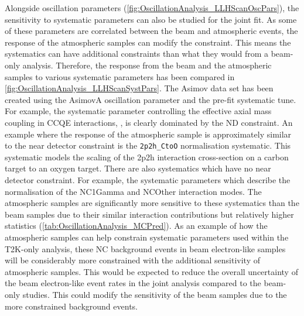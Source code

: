 \clearpage

Alongside oscillation parameters (\autoref{fig:OscillationAnalysis_LLHScanOscPars}), the sensitivity to systematic parameters can also be studied for the joint fit. As some of these parameters are correlated between the beam and atmospheric events, the response of the atmospheric samples can modify the constraint. This means the systematics can have additional constraints than what they would from a beam-only analysis. Therefore, the response from the beam and the atmospheric samples to various systematic parameters has been compared in \autoref{fig:OscillationAnalysis_LLHScanSystPars}. The Asimov data set has been created using the AsimovA oscillation parameter and the pre-fit systematic tune. For example, the systematic parameter controlling the effective axial mass coupling in CCQE interactions, , is clearly dominated by the ND constraint. An example where the response of the atmospheric sample is approximately similar to the near detector constraint is the \texttt{2p2h\_CtoO} normalisation systematic. This systematic models the scaling of the 2p2h interaction cross-section on a carbon target to an oxygen target. There are also systematics which have no near detector constraint. For example, the systematic parameters which describe the normalisation of the NC1Gamma and NCOther interaction modes. The atmospheric samples are significantly more sensitive to these systematics than the beam samples due to their similar interaction contributions but relatively higher statistics (\autoref{tab:OscillationAnalysis_MCPred}). As an example of how the atmospheric samples can help constrain systematic parameters used within the T2K-only analysis, these NC background events in beam electron-like samples will be considerably more constrained with the additional sensitivity of atmospheric samples. This would be expected to reduce the overall uncertainty of the beam electron-like event rates in the joint analysis compared to the beam-only studies. This could modify the sensitivity of the beam samples due to the more constrained background events.

